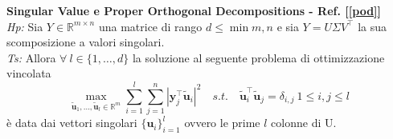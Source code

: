 \documentclass[serif]{beamer}
\newcommand{\R}{\mathbb{R}}
\begin{document}
\begin{frame}
\begin{theorem}\label{teo_pod}
\textbf{Singular Value e Proper Orthogonal Decompositions - Ref. [\ref{pod}]}\\
\textit{Hp:} Sia \( Y \in \R^{m \times n}\) una matrice di rango \(d \leq \min{{m,n}}\) e  sia \(Y=U \Sigma V^\top\) la sua scomposizione a valori singolari.\\
\textit{Ts:} Allora \( \forall \ l \in \{1,\dots,d\} \) la soluzione al seguente problema di ottimizzazione vincolata
\[
\max_{\mathbf{\tilde{u}}_1, \dots, \mathbf{\tilde{u}}_l \in \R^m} \sum_{i=1}^l \sum_{j=1}^n | \mathbf{y}_j^\top \mathbf{\tilde{u}}_i |^2 \quad s.t. \quad  \mathbf{\tilde{u}}_i^\top \mathbf{\tilde{u}}_j = \delta_{i,j} \ 1 \leq i,j \leq l
\]
 è data dai vettori singolari \( \{ \mathbf{u}_i\}_{i=1}^l\) ovvero le prime \(l\) colonne di U.
\end{theorem}
\end{frame}
\end{document}
